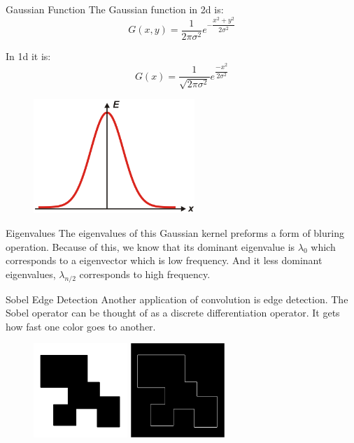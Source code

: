 \documentclass{beamer}
\begin{document}
\begin{frame}{Gaussian Function}
The Gaussian function in 2d is:
$$G(x,y) = \dfrac{1}{2\pi \sigma^2}e^{-\dfrac{x^2+y^2}{2 \sigma^2}}$$

In 1d it is:
$$ G(x) = \dfrac{1}{\sqrt{2\pi \sigma^2}}e^{\dfrac{-x^2}{2\sigma^2}}$$

\begin{figure}[ht]
\includegraphics[width=2.4in]{gauss.png}
\end{figure}
\end{frame}


\begin{frame} {Eigenvalues}
The eigenvalues of this Gaussian kernel preforms a form of bluring operation. Because of this, we know that its dominant eigenvalue is $\lambda_0$ which corresponds to a eigenvector which is low frequency. And it less dominant eigenvalues, $\lambda_{n/2}$ corresponds to high frequency.

\end{frame}


\begin{frame}{Sobel Edge Detection}
Another application of convolution is edge detection. The Sobel operator can be thought of as a discrete differentiation operator. It gets how fast one color goes to another. 

\begin{figure}[ht]
\includegraphics[width=1.4in]{edgein.png}
\hspace{.1in}
\includegraphics[width=1.4in]{edgeout.jpg}
\hspace{.1in}
\end{figure}
\end{frame}
\end{document}

